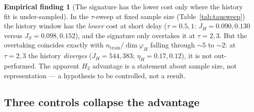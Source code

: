 \documentclass[11pt]{article}
\renewcommand{\_}{\discretionary{\textunderscore}{}{\textunderscore}}
\theoremstyle{plain}
\theoremstyle{definition}
\newtheorem{finding}[theorem]{Empirical finding}
\begin{document}
\begin{finding}[The signature has the lower cost only where the history fit is under-sampled]\label{find:apparent}
In the $\tau$-sweep at fixed sample size (Table~\ref{tab:tausweep}) the history window has the
\emph{lower} cost at short delay ($\tau=0.5,1$: $J_H=0.090,0.130$ versus $J_S=0.098,0.152$), and
the signature only overtakes it at $\tau=2,3$. But the overtaking coincides exactly with
$n_{\text{train}}/\dim\varphi_H$ falling through ${\sim}5$ to ${\sim}2$: at $\tau=2,3$ the history
\emph{diverges} ($J_H=544,383$; $\eta_H=0.17,0.12$), it is not out-performed. The apparent
$H_2$ advantage is a statement about sample size, not representation --- a hypothesis to be
controlled, not a result.
\end{finding}

\subsection{Three controls collapse the advantage}
\end{document}
